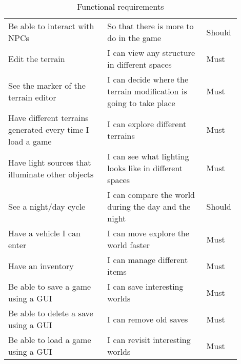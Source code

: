 \begin{table}[h]
\begin{tabular}{|p{0.4\linewidth}|p{0.4\linewidth}|p{0.1\linewidth}|}
        Be able to interact with NPCs                              & So that there is more to do in the game                            & Should         \\
        Edit the terrain                                           & I can view any structure in different spaces                       & Must           \\
        See the marker of the terrain editor                       & I can decide where the terrain modification is going to take place & Must           \\
        Have different terrains generated every time I load a game & I can explore different terrains                                   & Must           \\
        Have light sources that illuminate other objects           & I can see what lighting looks like in different spaces             & Must           \\
        See a night/day cycle                                      & I can compare the world during the day and the night               & Should         \\
        Have a vehicle I can enter                                 & I can move explore the world faster                                & Must           \\
        Have an inventory                                          & I can manage different items                                       & Must           \\
        Be able to save a game using a GUI                         & I can save interesting worlds                                      & Must           \\
        Be able to delete a save using a GUI                       & I can remove old saves                                             & Must           \\
        Be able to load a game using a GUI                         & I can revisit interesting worlds                                   & Must           \\
        \hline
    \end{tabular}
    \caption{Functional requirements}
    \label{tab:functional_requirements}
\end{table}